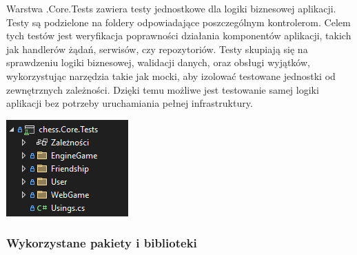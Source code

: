 \documentclass[12pt,a4paper]{article}
\begin{document}
\vspace{0.5cm}
\begin{minipage}[t]{0.45\textwidth}
    \vspace{0pt}
    \raggedright
    Warstwa .Core.Tests zawiera testy jednostkowe dla logiki biznesowej aplikacji. Testy są podzielone na foldery odpowiadające poszczególnym kontrolerom. Celem tych testów jest weryfikacja poprawności działania komponentów aplikacji, takich jak handlerów żądań, serwisów, czy repozytoriów. Testy skupiają się na sprawdzeniu logiki biznesowej, walidacji danych, oraz obsługi wyjątków, wykorzystując narzędzia takie jak mocki, aby izolować testowane jednostki od zewnętrznych zależności. Dzięki temu możliwe jest testowanie samej logiki aplikacji bez potrzeby uruchamiania pełnej infrastruktury.
\end{minipage}
\hfill
\begin{minipage}[t]{0.45\textwidth}
    \vspace{0pt}
    \centering
    \includegraphics[width=\linewidth]{zdj/struktura_back_core_tests.png} 
\end{minipage}
\vspace{0.5cm}

\newpage

\subsubsection{Wykorzystane pakiety i biblioteki}
\end{document}

